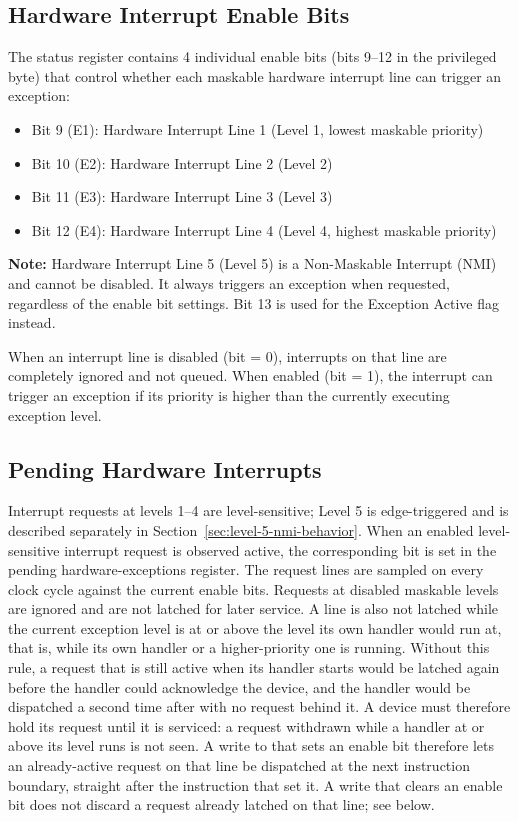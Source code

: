 \subsection{Hardware Interrupt Enable Bits}
\label{sec:hardware-interrupt-enable-bits}

The status register contains 4 individual enable bits (bits 9--12 in the privileged byte) that control whether each
maskable hardware interrupt line can trigger an exception:

\begin{itemize}
	\item Bit 9 (E1): Hardware Interrupt Line 1 (Level 1, lowest maskable priority)
	\item Bit 10 (E2): Hardware Interrupt Line 2 (Level 2)
	\item Bit 11 (E3): Hardware Interrupt Line 3 (Level 3)
	\item Bit 12 (E4): Hardware Interrupt Line 4 (Level 4, highest maskable priority)
\end{itemize}

\textbf{Note:} Hardware Interrupt Line 5 (Level 5) is a Non-Maskable Interrupt (NMI) and cannot be disabled.
It always triggers an exception when requested, regardless of the enable bit settings. Bit 13 is used for the
Exception Active flag instead.

When an interrupt line is disabled (bit = 0), interrupts on that line are completely ignored and not queued. When
enabled (bit = 1), the interrupt can trigger an exception if its priority is higher than the currently executing
exception level.

\subsection{Pending Hardware Interrupts}
\label{sec:pending-hardware-interrupts}

Interrupt requests at levels 1--4 are level-sensitive; Level 5 is edge-triggered and is described separately in
Section~\ref{sec:level-5-nmi-behavior}. When an enabled level-sensitive interrupt request is observed active, the
corresponding bit is set in the pending hardware-exceptions register. The request lines are sampled on every clock
cycle against the current enable bits. Requests at disabled maskable levels are ignored and are not latched for later
service. A line is also not latched while the current exception level is at or above the level its own handler would
run at, that is, while its own handler or a higher-priority one is running. Without this rule, a request that is still
active when its handler starts would be latched again before the handler could acknowledge the device, and the handler
would be dispatched a second time after  with no request behind it. A device must therefore hold its
request until it is serviced: a request withdrawn while a handler at or above its level runs is not seen. A write to
 that sets an enable bit therefore lets an already-active request on that line be dispatched at the next
instruction boundary, straight after the instruction that set it. A write that clears an enable bit does not discard a
request already latched on that line; see below.

